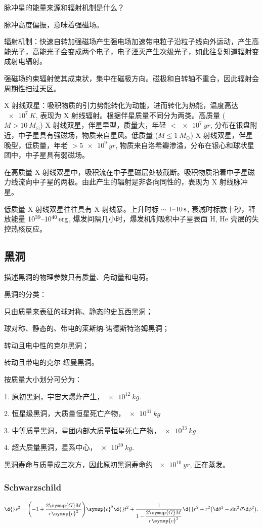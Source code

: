 \documentclass[../天体物理基础.tex]{subfiles}
\begin{document}
脉冲星的能量来源和辐射机制是什么？

脉冲高度偏振，意味着强磁场。

辐射机制：快速自转加强磁场产生强电场加速带电粒子沿粒子线向外运动，产生高能光子，高能光子会变成两个电子，电子湮灭产生次级光子，如此往复知道辐射变成射电辐射。

强磁场约束辐射使其成束状，集中在磁极方向。磁极和自转轴不重合，因此辐射会周期性扫过天区。

X 射线双星：吸积物质的引力势能转化为动能，进而转化为热能，温度高达 $\qty{e7}{K}$, 表现为 X 射线辐射。根据伴星质量不同分为两类。高质量 ($M>\qty{10}{M_{\odot}}$) X 射线双星，伴星早型，质量大，年轻 $<\qty{e7}{yr}$, 分布在银盘附近，中子星具有强磁场，物质来自星风。低质量 ($M\le\qty{1}{M_{\odot}}$) X 射线双星，伴星晚型，低质量，年老 $>\qty{5e9}{yr}$, 物质来自洛希瓣渗溢，分布在银心和球状星团中，中子星具有弱磁场。

在高质量 X 射线双星中，吸积流在中子星磁层处被截断。吸积物质沿着中子星磁力线流向中子星的两极。由此产生的辐射是非各向同性的，表现为 X 射线脉冲星。

低质量 X 射线双星往往具有 X 射线暴。上升时标 $\sim1\text{\textendash}\qty{10}{s}$, 衰减时标数十秒，释放能量 $10^{39}\text{\textendash}\qty{e40}{erg}$, 爆发间隔几小时，爆发机制吸积中子星表面 H, He 壳层的失控热核反应。

\subsection{黑洞}
描述黑洞的物理参数只有质量、角动量和电荷。

黑洞的分类：

只由质量来表征的球对称、静态的史瓦西黑洞；

球对称、静态的、带电的莱斯纳{}-{}诺德斯特洛姆黑洞；

转动且电中性的克尔黑洞；

转动且带电的克尔{}-{}纽曼黑洞。

按质量大小划分可分为：

1. 原初黑洞，宇宙大爆炸产生，$\qty{e12}{kg}$.

2. 恒星级黑洞，大质量恒星死亡产物，$\qty{e31}{kg}$

3. 中等质量黑洞，星团内部大质量恒星死亡产物，$\qty{e33}{kg}$

4. 超大质量黑洞，星系中心，$\qty{e39}{kg}$.

黑洞寿命与质量成三次方，因此原初黑洞寿命约 $\qty{e10}{yr}$, 正在蒸发。

\subsubsection{Schwarzschild}
\begin{equation}
\d{}s^{2}=\mleft(-1+\frac{2\symup{G}M}{r\symup{c}^{2}}\mright)\symup{c}^{2}\d{}t^{2}+\frac{1}{1-\dfrac{2\symup{G}M}{r\symup{c}^{2}}}\d{}r^{2}+r^{2}\mleft(\d\theta^{2}-\sin^{2}{\theta}\d\phi^{2}\mright).
\end{equation}
\end{document}
